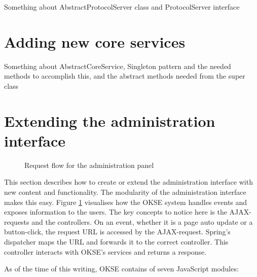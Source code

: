 Something about AbstractProtocolServer class and ProtocolServer interface

\section{Adding new core services}
\label{sec:adding-new-core-services}

Something about AbstractCoreService, Singleton pattern and the needed methods to accomplish this, and the abstract methods needed from the super class

\section{Extending the administration interface}
\label{sec:adding-new-panes}

\begin{center}
  \begin{figure}[ht!]
    \caption{Request flow for the administration panel}
    \label{fig:oac-request-flow}
  \end{figure}
\end{center}

This section describes how to create or extend the administration interface with new content and functionality. The modularity of the administration interface makes this easy. Figure \ref{fig:oac-request-flow} visualises how the OKSE system handles events and exposes information to the users. The key concepts to notice here is the AJAX-requests and the controllers. On an event, whether it is a page auto update or a button-click, the request URL is accessed by the AJAX-request. Spring's dispatcher maps the URL and forwards it to the correct controller. This controller interacts with OKSE's services and returns a response.

As of the time of this writing, OKSE contains of seven JavaScript modules: 

